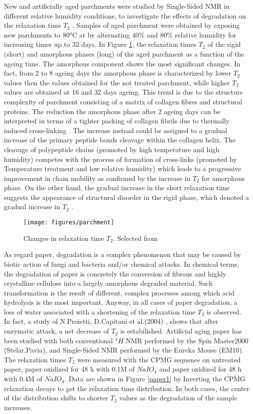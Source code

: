 \documentclass[a4paper,11pt]{report}
\begin{document}
New and artificially aged parchments were studied by Single-Sided NMR in different relative humidity conditions, to investigate the effects of degradation on the relaxation time $T_2$ \cite{ottopaper}. Samples of aged parchment were obtained by exposing new parchments to \ang{80}C at by alternating $40\%$ and $80\%$ relative humidity for increasing times up to 32 days. In Figure \ref{parchment}, the relaxation times $T_2$ of the rigid (short) and amorphous phases (long) of the aged parchment as a function of the ageing time.  The amorphous component shows the most significant changes. In fact, from 2 to 8 ageing days the amorphous phase is characterized by lower $T_2$ values then the values obtained for the not treated parchment, while higher $T_2$ values are obtained at 16 and 32 days ageing. This trend is due to the structure complexity of parchment consisting of a matrix of collagen fibres and structural proteins. The reduction the amorphous phase after 2 ageing days can be interpreted in terms of a tighter packing of collagen fibrils due to thermally induced cross-linking \cite{ottopaper}. The increase instead could be assigned to a gradual increase of the primary peptide bonds cleavage within the collagen helix. The cleavage of polypeptide chains (promoted by high temperature and high humidity) competes with the process of formation of cross-links (promoted by Temperature treatment and low relative humidity) which leads to a progressive improvement in chain mobility as confirmed by the increase in $T_2$ for amorphous phase. On the other hand, the gradual increase in the short relaxation time suggests the appearance of structural disorder in the rigid phase, which denoted a gradual increase in $T_2$ \cite{ottopaper}.
\begin{figure}[h]
	\centering
	\texttt{[image: figures/parchment]}
	\caption{Changes in relaxation time $T_2$. Selected from \cite{ottopaper} }\label{parchment}
\end{figure}
As regard paper, degradation is a complex phenomenon that may be caused by biotic action of fungi and bacteria and/or chemical attacks. In chemical terms, the degradation of paper is concretely the conversion of fibrous and highly crystalline cellulose into a largely amorphous degraded material. Such transformation is the result of different, complex processes among which acid hydrolysis is the most important. Anyway, in all cases of paper degradation, a loss of water associated with a shortening of the  relaxation time $T_2$ is observed. In fact, a study of N.Proietti, D.Capitani et al.(2004) \cite{settepaper}, shows that after enzymatic attack, a net decrease of $T_2$ is estabilished. Artificial aging paper has been studied with both conventional $^1H$ NMR performed by the Spin Master2000 (Stelar,Pavia), and Single-Sided NMR performed by the Eureka Mouse (EM10). The relaxation times $T_2$ were measured with the CPMG sequence on untreated paper, paper oxidized for 48 h with 0.1M of $NaIO_4$ and  paper oxidized for 48 h with 0.4M of $NaIO_4$. Data are shown in Figure \ref{paper1} by Inverting the CPMG relaxation decays to get the relaxation time distribution. In both cases, the center of the distribution shifts to shorter $T_2$ values as the degradation of the sample increases.
\end{document}

